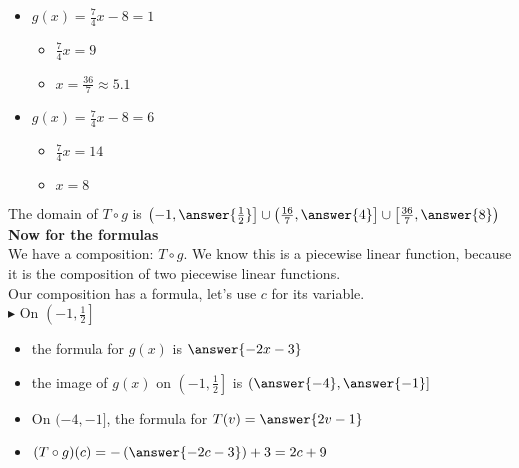 \documentclass{ximera}
\begin{document}
\begin{itemize}
\item $g(x) = \frac{7}{4}x -8 = 1$
\begin{itemize}
\item $\frac{7}{4}x = 9$
\item $x = \frac{36}{7} \approx 5.1$
\end{itemize}
\end{itemize}

\begin{itemize}
\item $g(x) = \frac{7}{4}x -8 = 6$
\begin{itemize}
\item $\frac{7}{4}x = 14$
\item $x = 8$
\end{itemize}
\end{itemize}











The domain of $T \circ g$ is $\left( -1, \answer{\frac{1}{2}} \right] \cup \left( \frac{16}{7}, \answer{4} \right] \cup \left[ \frac{36}{7}, \answer{8} \right)$ \\


\textbf{Now for the formulas} \\


We have a composition: $T \circ g$.  We know this is a piecewise linear function, because it is the composition of two piecewise linear functions. \\

Our composition has a formula, let's use $c$ for its variable. \\





$\blacktriangleright$ On $\left( -1, \frac{1}{2} \right]$




\begin{itemize}

\item the formula for $g(x)$ is $\answer{-2x-3}$
\item the image of $g(x)$ on $\left( -1, \frac{1}{2} \right]$ is $\left( \answer{-4}, \answer{-1} \right]$
\item On $( -4, -1 ]$, the formula for $T(v) = \answer{2v-1}$  \\
\item $(T \circ g)(c) = -\left(\answer{-2c-3}\right) + 3 = 2c +9$ \\


\end{itemize}
\end{document}
